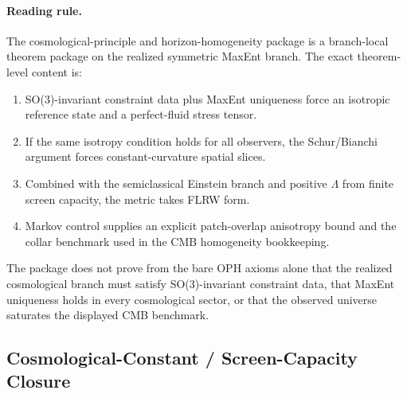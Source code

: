 \paragraph{\textbf{Reading rule.}}
The cosmological-principle and horizon-homogeneity package is a branch-local theorem package on the
realized symmetric MaxEnt branch. The exact theorem-level content is:
\begin{enumerate}[leftmargin=2em]
\item SO(3)-invariant constraint data plus MaxEnt uniqueness force an isotropic reference state and
      a perfect-fluid stress tensor.
\item If the same isotropy condition holds for all observers, the Schur/Bianchi argument forces
      constant-curvature spatial slices.
\item Combined with the semiclassical Einstein branch and positive \(\Lambda\) from finite screen
      capacity, the metric takes FLRW form.
\item Markov control supplies an explicit patch-overlap anisotropy bound and the collar benchmark
      used in the CMB homogeneity bookkeeping.
\end{enumerate}
The package does not prove from the bare OPH axioms alone that the realized cosmological branch
must satisfy SO(3)-invariant constraint data, that MaxEnt uniqueness holds in every cosmological
sector, or that the observed universe saturates the displayed CMB benchmark.

\subsection{Cosmological-Constant / Screen-Capacity Closure}


